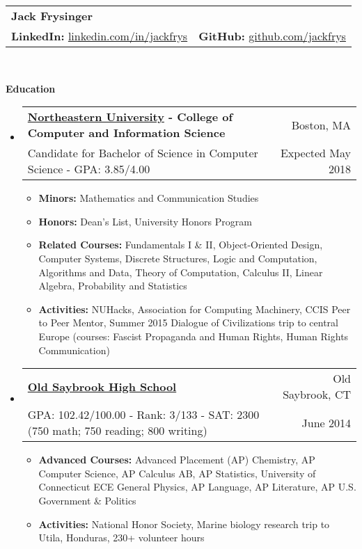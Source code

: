 \documentclass[letterpaper,10.6pt]{article}
\makeatletter
\newcommand{\resitem}[1]{\item #1 \vspace{-2pt}}
\newcommand{\resheading}[1]{{\large \colorbox{mygrey}{\begin{minipage}{\textwidth}{\textbf{#1 \vphantom{p\^{E}}}}\end{minipage}}}}
\newcommand{\ressubheading}[4]{
\begin{tabular*}{6.8in}{l@{\extracolsep{\fill}}r}
		\textbf{#1} & #2 \\
		\small{#3} & \small{#4} \\
\end{tabular*}\vspace{-6pt}}
\makeatother
\begin{document}
\newcommand{\mywebheader}{
\begin{tabular*}{7in}{l@{\extracolsep{\fill}}r}
	\textbf{\LARGE Jack Frysinger} &
	\\\textbf{LinkedIn:} \href{http://linkedin.com/in/jackfrys}{linkedin.com/in/jackfrys} & \textbf{GitHub:} \href{https://github.com/jackfrys}{github.com/jackfrys}
	\end{tabular*}
	\\\vspace{0.1in}}

\mywebheader

\resheading{Education}
	\begin{itemize}[leftmargin=*]
		\item[]
			\ressubheading{\href{http://www.northeastern.edu}{Northeastern University} - College of Computer and Information Science}{Boston, MA}{{Candidate for Bachelor of Science in Computer Science - }{GPA: 3.85/4.00}}{Expected May 2018}
				{ \footnotesize
				\begin{itemize}
					\resitem{\textbf{Minors:} Mathematics and Communication Studies}
					\resitem{\textbf{Honors:} Dean's List, University Honors Program}
					\resitem{\textbf{Related Courses:} Fundamentals I \& II, Object-Oriented Design, Computer Systems, Discrete Structures, Logic and Computation, Algorithms and Data, Theory of Computation, Calculus II, Linear Algebra, Probability and Statistics}
					\resitem{\textbf{Activities:} NUHacks, Association for Computing Machinery, CCIS Peer to Peer Mentor, Summer 2015 Dialogue of Civilizations trip to central Europe (courses: Fascist Propaganda and Human Rights, Human Rights Communication)}
				\end{itemize}}
		\item[]
			\ressubheading{\href{http://www.oldsaybrookschools.org/page.cfm?p=605}{Old Saybrook High School}}{Old Saybrook, CT}{{GPA: 102.42/100.00 - Rank: 3/133 - SAT: 2300 (750 math; 750 reading; 800 writing)}}{June 2014}
			{\footnotesize
			\begin{itemize}
				\resitem{\textbf{Advanced Courses:} Advanced Placement (AP) Chemistry, AP Computer Science, AP Calculus AB, AP Statistics, University of Connecticut ECE General Physics, AP Language, AP Literature, AP U.S. Government \& Politics}
				\resitem{\textbf{Activities:} National Honor Society, Marine biology research trip to Utila, Honduras, 230+ volunteer hours}
			\end{itemize}}
	\end{itemize}
	
\end{document}
